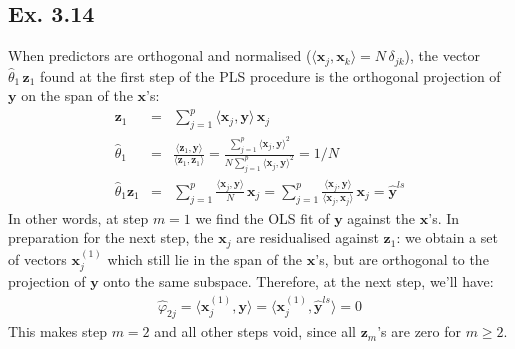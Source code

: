 \subsection*{Ex. 3.14}
When predictors are orthogonal and normalised ($\langle \mathbf{x}_j, \mathbf{x}_k \rangle = N \, \delta_{jk}$), the vector $\hat{\theta}_1 \, \mathbf{z}_1$ found at the first step of the PLS procedure is the orthogonal projection of $\mathbf{y}$ on the span of the $\mathbf{x}$'s:
\begin{eqnarray*}
\mathbf{z}_1 & = & \sum_{j=1}^p \langle \mathbf{x}_j, \mathbf{y} \rangle\, \mathbf{x}_j\\
\hat{\theta}_1 & = & \frac{\langle \mathbf{z}_1, \mathbf{y} \rangle}{\langle \mathbf{z}_1, \mathbf{z}_1 \rangle} = \frac{\sum_{j=1}^p \langle \mathbf{x}_j, \mathbf{y} \rangle ^2}{N \sum_{j=1}^p \langle  \mathbf{x}_j, \mathbf{y} \rangle ^2} = 1/N\\
\hat{\theta}_1 \mathbf{z}_1 & = & \sum_{j=1}^p \frac{\langle \mathbf{x}_j, \mathbf{y} \rangle}{N} \, \mathbf{x}_j = \sum_{j=1}^p \frac{\langle \mathbf{x}_j, \mathbf{y} \rangle}{\langle \mathbf{x}_j, \mathbf{x}_j \rangle} \, \mathbf{x}_j = \hat{\mathbf{y}}^{ls}
\end{eqnarray*}
In other words, at step $m = 1$ we find the OLS fit of $\mathbf{y}$ against the $\mathbf{x}$'s. In preparation
for the next step, the $\mathbf{x}_j$ are residualised against $\mathbf{z}_1$: we obtain a set of vectors
$\mathbf{x}_j^{(1)}$ which still lie in the span of the $\mathbf{x}$'s, but are orthogonal to the projection
of $\mathbf{y}$ onto the same subspace. Therefore, at the next step, we'll have:
\begin{eqnarray*}
\hat{\varphi}_{2j} = \langle \mathbf{x}_{j}^{(1)}, \mathbf{y} \rangle =  \langle \mathbf{x}_{j}^{(1)}, \hat{\mathbf{y}}^{ls} \rangle = 0
\end{eqnarray*}
This makes step $m = 2$ and all other steps void, since all $\mathbf{z}_m$'s are zero for $m \geq 2$.

